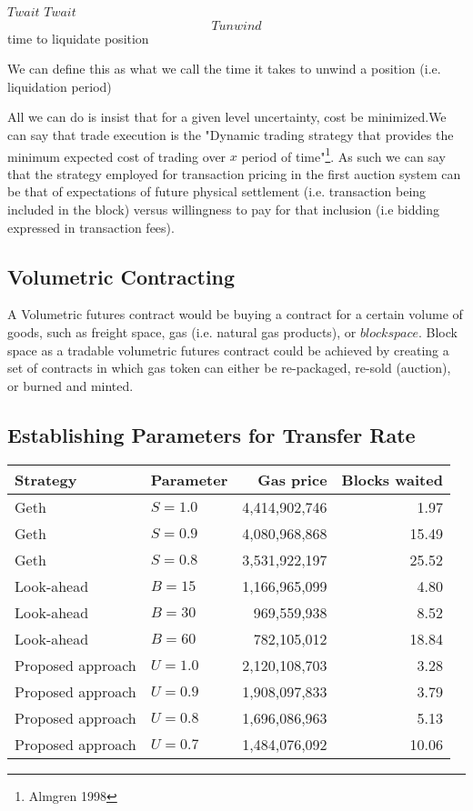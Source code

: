 $Twait$
    \vspace{2mm}
$Twait$
    \vspace{2mm}
$$Tunwind$$ time to liquidate position



We can define this as what we call the time it takes to unwind a position (i.e. liquidation period)

    \vspace{2mm}

All we can do is insist that for a given level uncertainty, cost be minimized.We can say that trade execution is the
"Dynamic trading
strategy that provides the minimum expected cost of trading over $x$
period of time"\footnote{Almgren 1998}. As such we can say that the
strategy employed for transaction pricing in the first auction system
can be that of expectations of future physical settlement (i.e.
transaction being included in the block) versus willingness to pay for
that inclusion (i.e bidding expressed in transaction fees).
    \vspace{2mm}
\subsection{Volumetric Contracting}

A Volumetric futures contract would be buying a contract for a certain
volume of goods, such as freight space, gas (i.e. natural gas
products), or $block space$. Block space as a tradable volumetric
futures contract could be achieved by creating a set of contracts in
which gas token can either be re-packaged, re-sold (auction), or burned and minted.
    \vspace{2mm}
\subsection{Establishing Parameters for Transfer Rate}

\begin{tabular}{llrr}
\hline Strategy & Parameter & Gas price & Blocks waited \\
\hline Geth & \(S =1.0\) & 4,414,902,746 & 1.97 \\
Geth & \(S =0.9\) & 4,080,968,868 & 15.49 \\
Geth & \(S =0.8\) & 3,531,922,197 & 25.52 \\
\hline Look-ahead & \(B =15\) & 1,166,965,099 & 4.80 \\
Look-ahead & \(B =30\) & 969,559,938 & 8.52 \\
Look-ahead & \(B =60\) & 782,105,012 & 18.84 \\
\hline Proposed approach & \(U =1.0\) & 2,120,108,703 & 3.28 \\
Proposed approach & \(U =0.9\) & 1,908,097,833 & 3.79 \\
Proposed approach & \(U =0.8\) & 1,696,086,963 & 5.13 \\
Proposed approach & \(U =0.7\) & 1,484,076,092 & 10.06
\end{tabular}
    \vspace{2mm}
